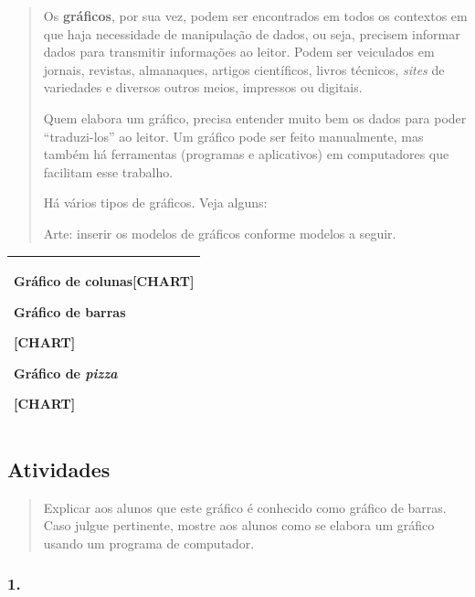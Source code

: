 \begin{quote}
Os \textbf{gráficos}, por sua vez, podem ser encontrados em todos os
contextos em que haja necessidade de manipulação de dados, ou seja,
precisem informar dados para transmitir informações ao leitor. Podem ser
veiculados em jornais, revistas, almanaques, artigos científicos, livros
técnicos, \emph{sites} de variedades e diversos outros meios, impressos
ou digitais.

Quem elabora um gráfico, precisa entender muito bem os dados para poder
``traduzi-los'' ao leitor. Um gráfico pode ser feito manualmente, mas
também há ferramentas (programas e aplicativos) em computadores que
facilitam esse trabalho.

Há vários tipos de gráficos. Veja alguns:

Arte: inserir os modelos de gráficos conforme modelos a seguir.
\end{quote}

\begin{longtable}[]{@{}l@{}}
\toprule
\begin{minipage}[t]{0.97\columnwidth}\raggedright\strut
Gráfico de colunas{{[}CHART{]}}

Gráfico de barras

{{[}CHART{]}}

Gráfico de \emph{pizza}

{{[}CHART{]}}\strut
\end{minipage}\tabularnewline
\bottomrule
\end{longtable}

\subsection{Atividades}\label{atividades-8}

\begin{quote}
Explicar aos alunos que este gráfico é conhecido como gráfico de barras.
Caso julgue pertinente, mostre aos alunos como se elabora um gráfico
usando um programa de computador.
\end{quote}

\subsubsection{1. }\label{section-66}

